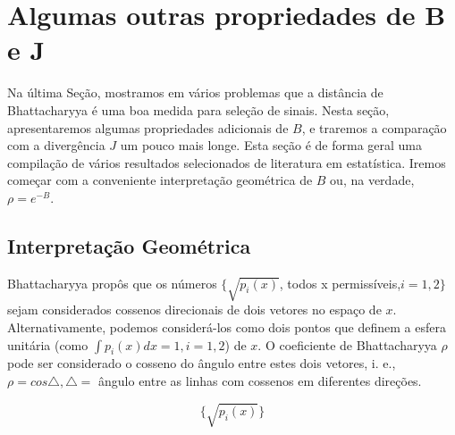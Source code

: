 \documentclass{sbrt2017port}
\begin{document}
\section{Algumas outras propriedades de B e J} \label{sec4}


Na última Seção, mostramos em vários problemas que a distância de Bhattacharyya é uma boa medida para seleção de sinais. Nesta seção, apresentaremos algumas propriedades adicionais de $B$, e traremos a comparação com a divergência $J$ um pouco mais longe. Esta seção é de forma geral uma compilação de vários resultados selecionados de literatura em estatística. Iremos começar com a conveniente interpretação geométrica de $B$ ou, na verdade, $\rho = e^{-B}$.

\subsection{Interpretação Geométrica}

Bhattacharyya \cite{r12} propôs que os números $ \{ \sqrt{p_i(x)}$, \quad todos \quad x \quad permissíveis,$ i=1,2 \} $ sejam considerados cossenos direcionais de dois vetores no espaço de $x$. Alternativamente, podemos considerá-los como dois pontos que definem a esfera unitária (como $ \int p_i(x)dx = 1, i = 1,2 $) de $x$. O coeficiente de Bhattacharyya $\rho$ pode ser considerado o cosseno do ângulo entre estes dois vetores, i. e., $ \rho = cos \bigtriangleup, \bigtriangleup = $ ângulo entre as linhas com cossenos em diferentes direções.

\begin{equation}
 \{ \sqrt{p_i(x)} \}
 \label{eq41}
\end{equation}
\end{document}
